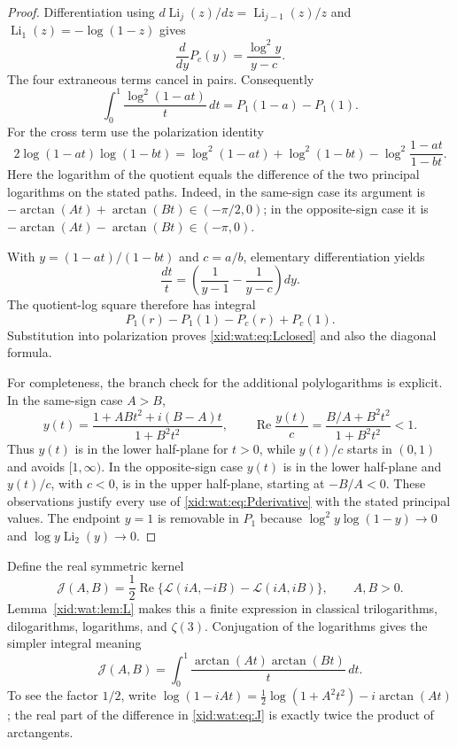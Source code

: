 \documentclass[11pt,a4paper]{article}
\numberwithin{equation}{section}
\theoremstyle{definition}
\theoremstyle{remark}
\begin{document}
\begin{proof}
Differentiation using
$d\operatorname{Li}_j(z)/dz=\operatorname{Li}_{j-1}(z)/z$ and
$\operatorname{Li}_1(z)=-\log(1-z)$ gives
\begin{equation}\label{xid:wat:eq:Pderivative}
 \frac{d}{dy}P_c(y)=\frac{\log^2y}{y-c}.
\end{equation}
The four extraneous terms cancel in pairs. Consequently
\[
 \int_0^1\frac{\log^2(1-at)}t\,dt
 =P_1(1-a)-P_1(1).
\]
For the cross term use the polarization identity
\[
 2\log(1-at)\log(1-bt)
 =\log^2(1-at)+\log^2(1-bt)
  -\log^2\frac{1-at}{1-bt}.
\]
Here the logarithm of the quotient equals the difference of the two
principal logarithms on the stated paths. Indeed, in the same-sign
case its argument is $-\arctan(At)+\arctan(Bt)\in(-\pi/2,0)$;
in the opposite-sign case it is
$-\arctan(At)-\arctan(Bt)\in(-\pi,0)$.

With $y=(1-at)/(1-bt)$ and $c=a/b$, elementary differentiation yields
\[
 \frac{dt}{t}=\left(\frac1{y-1}-\frac1{y-c}\right)dy.
\]
The quotient-log square therefore has integral
\[
 P_1(r)-P_1(1)-P_c(r)+P_c(1).
\]
Substitution into polarization proves \eqref{xid:wat:eq:Lclosed} and also
the diagonal formula.

For completeness, the branch check for the additional polylogarithms
is explicit. In the same-sign case $A>B$,
\[
 y(t)=\frac{1+ABt^2+i(B-A)t}{1+B^2t^2},
 \qquad
 \operatorname{Re}\frac{y(t)}c
 =\frac{B/A+B^2t^2}{1+B^2t^2}<1.
\]
Thus $y(t)$ is in the lower half-plane for $t>0$, while $y(t)/c$
starts in $(0,1)$ and avoids $[1,\infty)$.
In the opposite-sign case $y(t)$ is in the lower half-plane and
$y(t)/c$, with $c<0$, is in the upper half-plane, starting at
$-B/A<0$. These observations justify every use of
\eqref{xid:wat:eq:Pderivative} with the stated principal values. The
endpoint $y=1$ is removable in $P_1$ because
$\log^2y\log(1-y)\to0$ and
$\log y\operatorname{Li}_2(y)\to0$.
\end{proof}

Define the real symmetric kernel
\begin{equation}\label{xid:wat:eq:J}
 \mathcal J(A,B)=\frac12\operatorname{Re}
       \{\mathcal L(iA,-iB)-\mathcal L(iA,iB)\},
 \qquad A,B>0.
\end{equation}
Lemma~\ref{xid:wat:lem:L} makes this a finite expression in classical
trilogarithms, dilogarithms, logarithms, and $\zeta(3)$.
Conjugation of the logarithms gives the simpler integral meaning
\begin{equation}\label{xid:wat:eq:Jintegral}
 \mathcal J(A,B)=\int_0^1
              \frac{\arctan(At)\arctan(Bt)}t\,dt.
\end{equation}
To see the factor $1/2$, write
$\log(1-iAt)=\frac12\log(1+A^2t^2)-i\arctan(At)$;
the real part of the difference in \eqref{xid:wat:eq:J} is exactly twice
the product of arctangents.
\end{document}
